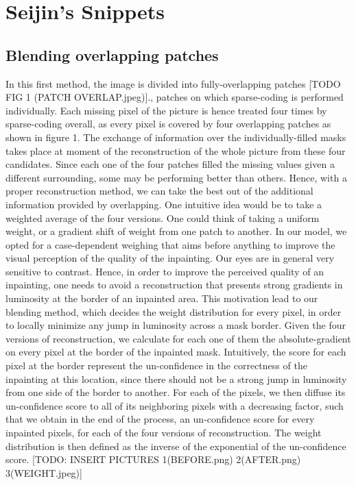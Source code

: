 \section*{Seijin's Snippets}

\subsection{Blending overlapping patches}

In this first method, the image is divided into fully-overlapping patches [TODO FIG 1 (PATCH OVERLAP.jpeg)]., patches on which sparse-coding is performed individually. Each missing pixel of the picture is hence treated four times by sparse-coding overall, as every pixel is covered by four overlapping patches as shown in figure 1. 
The exchange of information over the individually-filled masks takes place at moment of the reconstruction of the whole picture from these four candidates. Since each one of the four patches filled the missing values given a different surrounding, some may be performing better than others. Hence, with a proper reconstruction method, we can take the best out of the additional information provided by overlapping.
One intuitive idea would be to take a weighted average of the four versions. One could think of taking a uniform weight, or a gradient shift of weight from one patch to another. In our model, we opted for a case-dependent weighing that aims before anything to improve the visual perception of the quality of the inpainting. 
Our eyes are in general very sensitive to contrast. Hence, in order to improve the perceived quality of an inpainting, one needs to avoid a reconstruction that presents strong gradients in luminosity at the border of an inpainted area. This motivation lead to our blending method, which decides the weight distribution for every pixel, in order to locally minimize any jump in luminosity across a mask border.
Given the four versions of reconstruction, we calculate for each one of them the absolute-gradient on every pixel at the border of the inpainted mask. Intuitively, the score for each pixel at the border represent the un-confidence in the correctness of the inpainting at this location, since there should not be a strong jump in luminosity from one side of the border to another. For each of the pixels, we then diffuse its un-confidence score to all of its neighboring pixels with a decreasing factor, such that we obtain in the end of the process, an un-confidence score for every inpainted pixels, for each of the four versions of reconstruction. The weight distribution is then defined as the inverse of the exponential of the un-confidence score.
[TODO: INSERT PICTURES 1(BEFORE.png) 2(AFTER.png) 3(WEIGHT.jpeg)]

